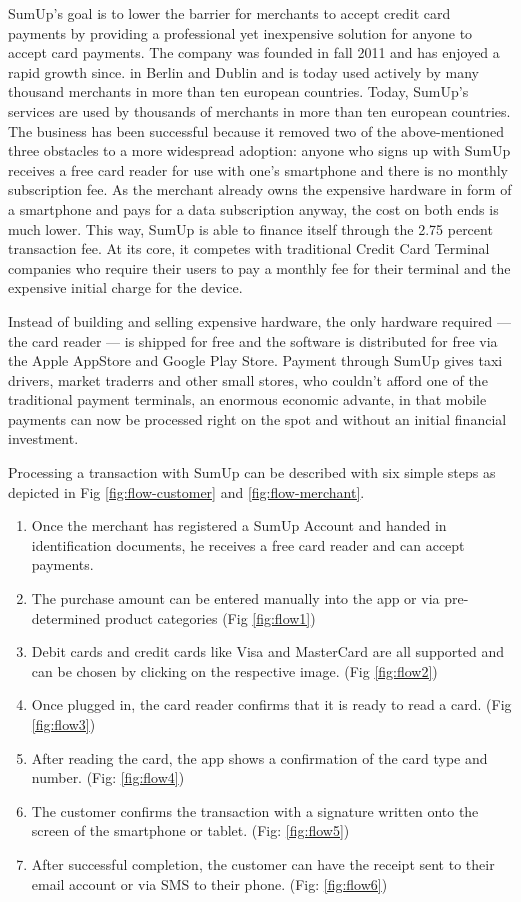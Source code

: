 \documentclass[a4paper, oneside]{csthesis}
\begin{document}
SumUp's goal is to lower the barrier for merchants to accept credit card payments by providing a professional yet inexpensive solution for anyone to accept card payments. The company was founded in fall 2011 and has enjoyed a rapid growth since.
in Berlin and Dublin and is today used actively by many thousand merchants in more than ten european countries. Today, SumUp's services are used by thousands of merchants in more than ten european countries.
The business has been successful because it removed two of the above-mentioned three obstacles to a more widespread adoption: anyone who signs up with SumUp receives a free card reader for use with one's smartphone and there is no monthly subscription fee. As the merchant already owns the expensive hardware in form of a smartphone and pays for a data subscription anyway, the cost on both ends is much lower. This way, SumUp is able to finance itself through the 2.75 percent transaction fee. At its core, it competes with traditional Credit Card Terminal companies who require their users to pay a monthly fee for their terminal and the expensive initial charge for the device.

Instead of building and selling expensive hardware, the only hardware required --- the card reader --- is shipped for free and the software is distributed for free via the Apple AppStore and Google Play Store.
Payment through SumUp gives taxi drivers, market traderrs and other small stores, who couldn't afford one of the traditional payment terminals, an enormous economic advante, in that mobile payments can now be processed right on the spot and without an initial financial investment.


Processing a transaction with SumUp can be described with six simple steps as depicted in Fig \ref{fig:flow-customer} and \ref{fig:flow-merchant}.

\begin{enumerate}
    \item Once the merchant has registered a SumUp Account and handed in identification documents, he receives a free card reader and can accept payments.
    \item The purchase amount can be entered manually into the app or via pre-determined product categories (Fig \ref{fig:flow1})
    \item Debit cards and credit cards like Visa and MasterCard are all supported and can be chosen by clicking on the respective image. (Fig \ref{fig:flow2})
    \item Once plugged in, the card reader confirms that it is ready to read a card. (Fig \ref{fig:flow3})
    \item After reading the card, the app shows a confirmation of the card type and number. (Fig: \ref{fig:flow4})
    \item The customer confirms the transaction with a signature written onto the screen of the smartphone or tablet. (Fig: \ref{fig:flow5})
    \item After successful completion, the customer can have the receipt sent to their email account or via SMS to their phone. (Fig: \ref{fig:flow6})
\end{enumerate}
\end{document}

